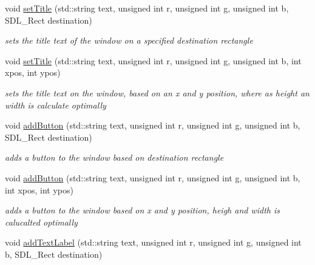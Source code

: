\begin{DoxyCompactItemize}
void \hyperlink{class_text_based_window_a2b043b3eb12b21948d1135ade9162c5e}{set\+Title} (std\+::string text, unsigned int r, unsigned int g, unsigned int b, S\+D\+L\+\_\+\+Rect destination)
\begin{DoxyCompactList}\small\item\em sets the title text of the window on a specified destination rectangle \end{DoxyCompactList}\item 
\hypertarget{class_text_based_window_a40ea95073627594dd9960a1389bd1737}{}\label{class_text_based_window_a40ea95073627594dd9960a1389bd1737} 
void \hyperlink{class_text_based_window_a40ea95073627594dd9960a1389bd1737}{set\+Title} (std\+::string text, unsigned int r, unsigned int g, unsigned int b, int xpos, int ypos)
\begin{DoxyCompactList}\small\item\em sets the title text on the window, based on an x and y position, where as height an width is calculate optimally \end{DoxyCompactList}\item 
\hypertarget{class_text_based_window_aaf5e0e7833f1ac447db95cf7a9a6b688}{}\label{class_text_based_window_aaf5e0e7833f1ac447db95cf7a9a6b688} 
void \hyperlink{class_text_based_window_aaf5e0e7833f1ac447db95cf7a9a6b688}{add\+Button} (std\+::string text, unsigned int r, unsigned int g, unsigned int b, S\+D\+L\+\_\+\+Rect destination)
\begin{DoxyCompactList}\small\item\em adds a button to the window based on destination rectangle \end{DoxyCompactList}\item 
\hypertarget{class_text_based_window_a1e280d42658ca5e0b4ae47d771e9b67a}{}\label{class_text_based_window_a1e280d42658ca5e0b4ae47d771e9b67a} 
void \hyperlink{class_text_based_window_a1e280d42658ca5e0b4ae47d771e9b67a}{add\+Button} (std\+::string text, unsigned int r, unsigned int g, unsigned int b, int xpos, int ypos)
\begin{DoxyCompactList}\small\item\em adds a button to the window based on x and y position, heigh and width is calucalted optimally \end{DoxyCompactList}\item 
\hypertarget{class_text_based_window_a9ccde2617fc92f028471b60ff6284eb3}{}\label{class_text_based_window_a9ccde2617fc92f028471b60ff6284eb3} 
void \hyperlink{class_text_based_window_a9ccde2617fc92f028471b60ff6284eb3}{add\+Text\+Label} (std\+::string text, unsigned int r, unsigned int g, unsigned int b, S\+D\+L\+\_\+\+Rect destination)

\end{DoxyCompactItemize}
